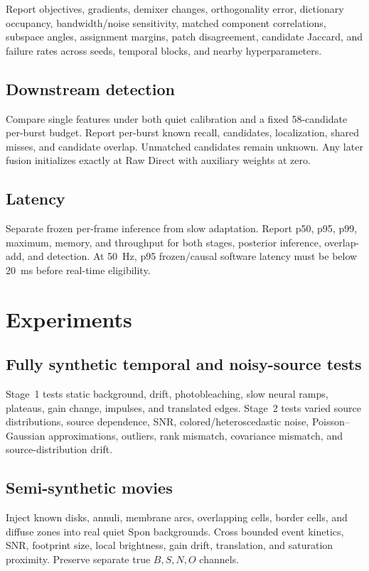 \documentclass[11pt]{article}
\begin{document}
Report objectives, gradients, demixer changes, orthogonality error, dictionary
occupancy, bandwidth/noise sensitivity, matched component correlations, subspace
angles, assignment margins, patch disagreement, candidate Jaccard, and failure
rates across seeds, temporal blocks, and nearby hyperparameters.

\subsection{Downstream detection}

Compare single features under both quiet calibration and a fixed 58-candidate
per-burst budget. Report per-burst known recall, candidates, localization,
shared misses, and candidate overlap. Unmatched candidates remain unknown. Any
later fusion initializes exactly at Raw Direct with auxiliary weights at zero.

\subsection{Latency}

Separate frozen per-frame inference from slow adaptation. Report p50, p95, p99,
maximum, memory, and throughput for both stages, posterior inference,
overlap-add, and detection. At 50~Hz, p95 frozen/causal software latency must be
below 20~ms before real-time eligibility.

\section{Experiments}

\subsection{Fully synthetic temporal and noisy-source tests}

Stage~1 tests static background, drift, photobleaching, slow neural ramps,
plateaus, gain change, impulses, and translated edges. Stage~2 tests varied
source distributions, source dependence, SNR, colored/heteroscedastic noise,
Poisson--Gaussian approximations, outliers, rank mismatch, covariance mismatch,
and source-distribution drift.

\subsection{Semi-synthetic movies}

Inject known disks, annuli, membrane arcs, overlapping cells, border cells, and
diffuse zones into real quiet Spon backgrounds. Cross bounded event kinetics,
SNR, footprint size, local brightness, gain drift, translation, and saturation
proximity. Preserve separate true \(B,S,N,O\) channels.
\end{document}
